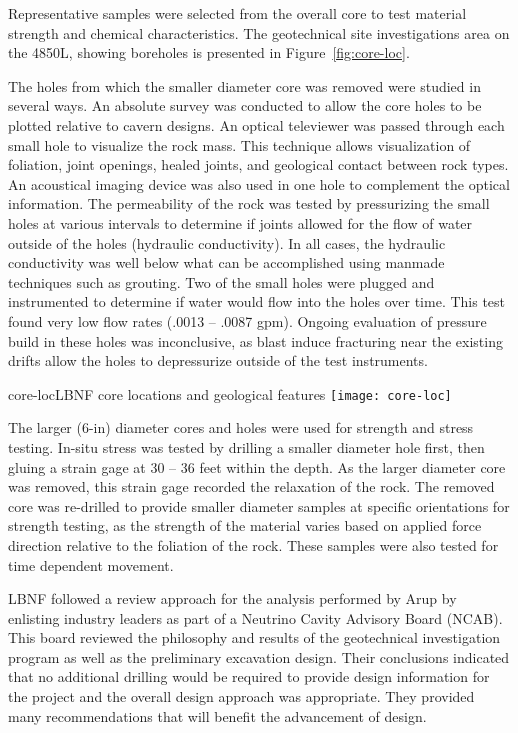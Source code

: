 Representative samples were selected from the overall core to test material strength and chemical characteristics. The geotechnical site investigations area on the 4850L, showing boreholes is presented in Figure~\ref{fig:core-loc}. 

The holes from which the smaller diameter core was removed were studied in several ways.  An absolute survey was conducted to allow the core holes to be plotted relative to cavern designs.  An optical televiewer was passed through each small hole to visualize the rock mass.  This technique allows visualization of foliation, joint openings, healed joints, and geological contact between rock types.  An acoustical imaging device was also used in one hole to complement the optical information.  The permeability of the rock was tested by pressurizing the small holes at various intervals to determine if joints allowed for the flow of water outside of the holes (hydraulic conductivity).  In all cases, the hydraulic conductivity was well below what can be accomplished using manmade techniques such as grouting.   Two of the small holes were plugged and instrumented to determine if water would flow into the holes over time.  This test found very low flow rates (.0013 -- .0087 gpm).  Ongoing evaluation of pressure build in these holes was inconclusive, as blast induce fracturing near the existing drifts allow the holes to depressurize outside of the test instruments.

\begin{cdrfigure}{core-loc}{LBNF core locations and geological features}
\texttt{[image: core-loc]}
\end{cdrfigure}

The larger (6-in) diameter cores and holes were used for strength and stress testing.  In-situ stress was tested by drilling a smaller diameter hole first, then gluing a strain gage at 30 -- 36 feet within the depth.  As the larger diameter core was removed, this strain gage recorded the relaxation of the rock.  The removed core was re-drilled to provide smaller diameter samples at specific orientations for strength testing, as the strength of the material varies based on applied force direction relative to the foliation of the rock.  These samples were also tested for time dependent movement. 

LBNF followed a review approach for the analysis performed by Arup by enlisting industry leaders as part of a Neutrino Cavity Advisory Board (NCAB).  This board reviewed the philosophy and results of the geotechnical investigation program as well as the preliminary excavation design.  Their conclusions indicated that no additional drilling would be required to provide design information for the project and the overall design approach was appropriate.  They provided many recommendations that will benefit the advancement of design.

